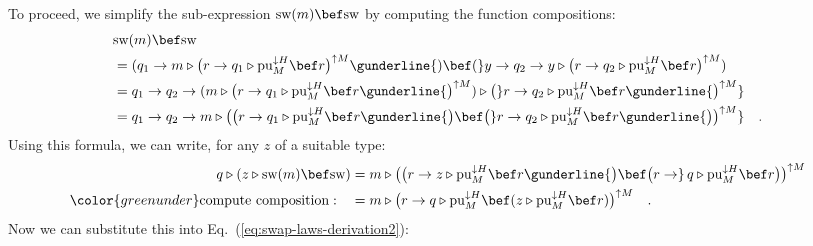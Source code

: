 To proceed, we simplify the sub-expression $\text{sw}(m)\bef\text{sw}$
by computing the function compositions:
\begin{align*}
 & \text{sw}(m)\bef\text{sw}\\
 & =(q_{1}\rightarrow m\triangleright\big(r\rightarrow q_{1}\triangleright\text{pu}_{M}^{\downarrow H}\bef r\big)^{\uparrow M}\gunderline{)\bef(}y\rightarrow q_{2}\rightarrow y\triangleright\big(r\rightarrow q_{2}\triangleright\text{pu}_{M}^{\downarrow H}\bef r\big)^{\uparrow M})\\
 & =q_{1}\rightarrow q_{2}\rightarrow(m\triangleright\big(r\rightarrow q_{1}\triangleright\text{pu}_{M}^{\downarrow H}\bef r\gunderline{\big)^{\uparrow M})\triangleright\big(}r\rightarrow q_{2}\triangleright\text{pu}_{M}^{\downarrow H}\bef r\gunderline{\big)^{\uparrow M}}\\
 & =q_{1}\rightarrow q_{2}\rightarrow m\triangleright\big(\big(r\rightarrow q_{1}\triangleright\text{pu}_{M}^{\downarrow H}\bef r\gunderline{\big)\bef\big(}r\rightarrow q_{2}\triangleright\text{pu}_{M}^{\downarrow H}\bef r\gunderline{\big)\big)^{\uparrow M}}\quad.
\end{align*}
Using this formula, we can write, for any $z$ of a suitable type:
\begin{align}
q\triangleright(z\triangleright\text{sw}(m)\bef\text{sw}) & =m\triangleright\big(\big(r\rightarrow z\triangleright\text{pu}_{M}^{\downarrow H}\bef r\gunderline{\big)\bef\big(r\rightarrow}\,q\triangleright\text{pu}_{M}^{\downarrow H}\bef r\big)\big)^{\uparrow M}\nonumber \\
{\color{greenunder}\text{compute composition}:}\quad & =m\triangleright\big(r\rightarrow q\triangleright\text{pu}_{M}^{\downarrow H}\bef(z\triangleright\text{pu}_{M}^{\downarrow H}\bef r)\big)^{\uparrow M}\quad.\label{eq:swap-law-3-derivation-1}
\end{align}
Now we can substitute this into Eq.~(\ref{eq:swap-laws-derivation2}):
